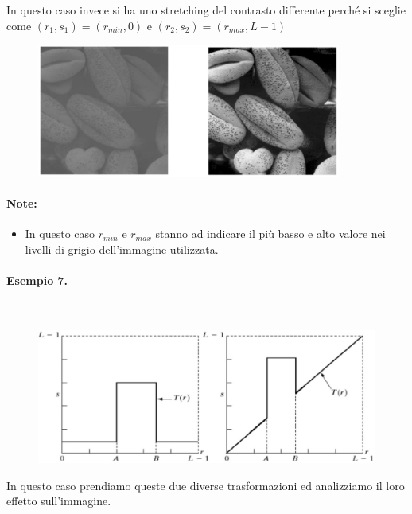 In questo caso invece si ha uno stretching del contrasto differente perché si
sceglie come $(r_1, s_1) = (r_{min}, 0)$ e $(r_2, s_2) = (r_{max} , L - 1)$

\begin{figure}[H]
    \centering
    \includegraphics[width=10cm, keepaspectratio]{capitoli/immagini/imgs/globuli_rossi.jpg}
\end{figure}

\paragraph{Note:}
\begin{itemize}
    \item In questo caso $r_{min}$ e $r_{max}$ stanno ad indicare il più basso e alto valore
          nei livelli di grigio dell'immagine utilizzata.
\end{itemize}

\paragraph{Esempio 7.}\ \\

\begin{figure}[H]
    \centering
    \includegraphics[width=\linewidth, keepaspectratio]{capitoli/immagini/imgs/trasformazioni_lineari_esempio_7.jpg}
\end{figure}

In questo caso prendiamo queste due diverse trasformazioni ed analizziamo il loro effetto sull'immagine.

